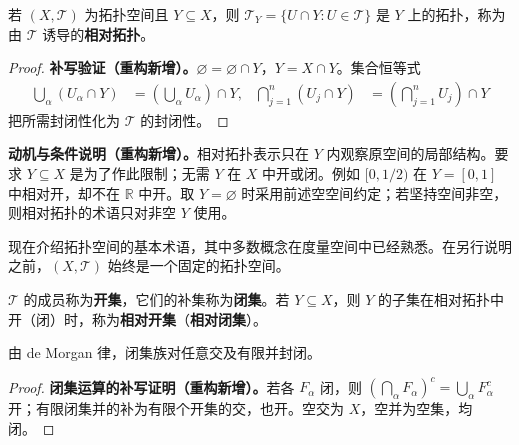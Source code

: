 \documentclass[../../main.tex]{subfiles}%
\begin{document}
\begin{definition}[相对拓扑]\label{definition:ch04-relative-topology}
若 $(X,\mathcal T)$ 为拓扑空间且 $Y\subseteq X$，则 $\mathcal T_Y=\{U\cap Y:U\in\mathcal T\}$ 是 $Y$ 上的拓扑，称为由 $\mathcal T$ 诱导的\textbf{相对拓扑}。
\end{definition}
\begin{proof}
\textbf{补写验证（重构新增）。}$\varnothing=\varnothing\cap Y$，$Y=X\cap Y$。集合恒等式
\begin{align*}
\bigcup_\alpha(U_\alpha\cap Y)&=\left(\bigcup_\alpha U_\alpha\right)\cap Y, &
\bigcap_{j=1}^n(U_j\cap Y)&=\left(\bigcap_{j=1}^nU_j\right)\cap Y
\end{align*}
把所需封闭性化为 $\mathcal T$ 的封闭性。
\end{proof}
\begin{remark}
\textbf{动机与条件说明（重构新增）。}相对拓扑表示只在 $Y$ 内观察原空间的局部结构。要求 $Y\subseteq X$ 是为了作此限制；无需 $Y$ 在 $X$ 中开或闭。例如 $[0,1/2)$ 在 $Y=[0,1]$ 中相对开，却不在 $\mathbb R$ 中开。取 $Y=\varnothing$ 时采用前述空空间约定；若坚持空间非空，则相对拓扑的术语只对非空 $Y$ 使用。
\end{remark}
现在介绍拓扑空间的基本术语，其中多数概念在度量空间中已经熟悉。在另行说明之前，$(X,\mathcal T)$ 始终是一个固定的拓扑空间。
\begin{definition}[开集、闭集及相对开闭集]\label{definition:ch04-open-closed}
$\mathcal T$ 的成员称为\textbf{开集}，它们的补集称为\textbf{闭集}。若 $Y\subseteq X$，则 $Y$ 的子集在相对拓扑中开（闭）时，称为\textbf{相对开集}（\textbf{相对闭集}）。
\end{definition}
\begin{proposition}\label{proposition:ch04-closed-set-operations}
由 de Morgan 律，闭集族对任意交及有限并封闭。
\end{proposition}
\begin{proof}
\textbf{闭集运算的补写证明（重构新增）。}若各 $F_\alpha$ 闭，则 $(\bigcap_\alpha F_\alpha)^c=\bigcup_\alpha F_\alpha^c$ 开；有限闭集并的补为有限个开集的交，也开。空交为 $X$，空并为空集，均闭。
\end{proof}
\end{document}
